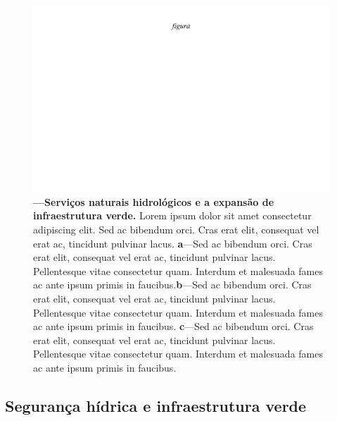 \documentclass[./main.tex]{subfiles}
\begin{document}
\begin{figure}[t!] 
\centering				
\includegraphics[width=0.98\linewidth]{figs/fig_m.jpg}		
\caption[Lorem ipsum dolor sit amet]
{\textbf{---\;Serviços naturais hidrológicos e a expansão de infraestrutura verde.}
    Lorem ipsum dolor sit amet consectetur adipiscing elit. Sed ac bibendum orci. Cras erat elit, consequat vel erat ac, tincidunt pulvinar lacus. \;\textbf{a}\;---\;Sed ac bibendum orci. Cras erat elit, consequat vel erat ac, tincidunt pulvinar lacus. Pellentesque vitae consectetur quam. Interdum et malesuada fames ac ante ipsum primis in faucibus.\;\textbf{b}\;---\;Sed ac bibendum orci. Cras erat elit, consequat vel erat ac, tincidunt pulvinar lacus. Pellentesque vitae consectetur quam. Interdum et malesuada fames ac ante ipsum primis in faucibus. \;\textbf{c}\;---\;Sed ac bibendum orci. Cras erat elit, consequat vel erat ac, tincidunt pulvinar lacus. Pellentesque vitae consectetur quam. Interdum et malesuada fames ac ante ipsum primis in faucibus.
}
\label{fig:eco:watersheds} 		
\end{figure}

\subsection{Segurança hídrica e infraestrutura verde} \label{sec:watersheds:watersecurity}
\end{document}
